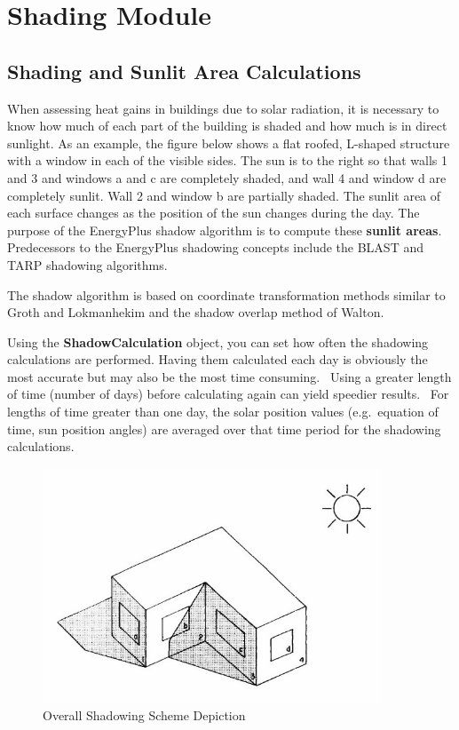 \section{Shading Module}\label{shading-module}

\subsection{Shading and Sunlit Area Calculations}\label{shading-and-sunlit-area-calculations}

When assessing heat gains in buildings due to solar radiation, it is necessary to know how much of each part of the building is shaded and how much is in direct sunlight. As an example, the figure below shows a flat roofed, L-shaped structure with a window in each of the visible sides. The sun is to the right so that walls 1 and 3 and windows a and c are completely shaded, and wall 4 and window d are completely sunlit. Wall 2 and window b are partially shaded. The sunlit area of each surface changes as the position of the sun changes during the day. The purpose of the EnergyPlus shadow algorithm is to compute these \textbf{sunlit areas}.~ Predecessors to the EnergyPlus shadowing concepts include the BLAST and TARP shadowing algorithms.

The shadow algorithm is based on coordinate transformation methods similar to Groth and Lokmanhekim and the shadow overlap method of Walton.

Using the \textbf{ShadowCalculation} object, you can set how often the shadowing calculations are performed. Having them calculated each day is obviously the most accurate but may also be the most time consuming.~ Using a greater length of time (number of days) before calculating again can yield speedier results.~ For lengths of time greater than one day, the solar position values (e.g.~equation of time, sun position angles) are averaged over that time period for the shadowing calculations.

\begin{figure}[hbtp] %
\centering
\includegraphics[width=0.9\textwidth, height=0.9\textheight, keepaspectratio=true]{media/image601.png}
\caption{  Overall Shadowing Scheme Depiction \protect \label{fig:overall-shadowing-scheme-depiction}}
\end{figure}

